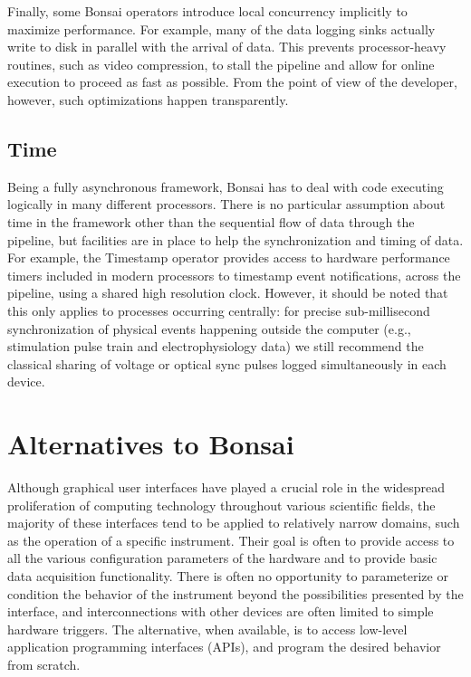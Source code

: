 Finally, some Bonsai operators introduce local concurrency implicitly to maximize performance. For example, many of the data logging sinks actually write to disk in parallel with the arrival of data. This prevents processor-heavy routines, such as video compression, to stall the pipeline and allow for online execution to proceed as fast as possible. From the point of view of the developer, however, such optimizations happen transparently.

\subsection{Time}

Being a fully asynchronous framework, Bonsai has to deal with code executing logically in many different processors. There is no particular assumption about time in the framework other than the sequential flow of data through the pipeline, but facilities are in place to help the synchronization and timing of data. For example, the Timestamp operator provides access to hardware performance timers included in modern processors to timestamp event notifications, across the pipeline, using a shared high resolution clock. However, it should be noted that this only applies to processes occurring centrally: for precise sub-millisecond synchronization of physical events happening outside the computer (e.g., stimulation pulse train and electrophysiology data) we still recommend the classical sharing of voltage or optical sync pulses logged simultaneously in each device.

\section{Alternatives to Bonsai}

Although graphical user interfaces have played a crucial role in the widespread proliferation of computing technology throughout various scientific fields, the majority of these interfaces tend to be applied to relatively narrow domains, such as the operation of a specific instrument. Their goal is often to provide access to all the various configuration parameters of the hardware and to provide basic data acquisition functionality. There is often no opportunity to parameterize or condition the behavior of the instrument beyond the possibilities presented by the interface, and interconnections with other devices are often limited to simple hardware triggers. The alternative, when available, is to access low-level application programming interfaces (APIs), and program the desired behavior from scratch.

